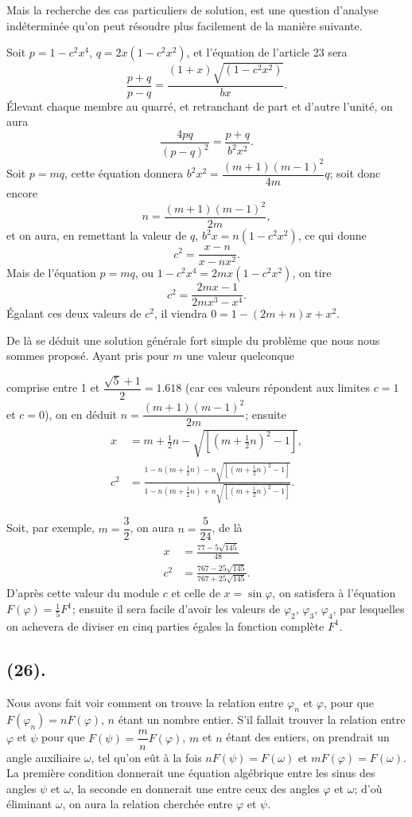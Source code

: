 \documentclass{article}
\begin{document}
Mais la recherche des cas particuliers de solution, est une question d'analyse indéterminée qu'on peut résoudre plus facilement de la manière suivante.

Soit $p=1-c^{2}x^{4}$, $q=2x(1-c^{2}x^{2})$, et l'équation de l'article 23 sera
\[ \frac{p+q}{p-q}=\frac{(1+x)\sqrt{(1-c^{2}x^{2})}}{bx}. \]
Élevant chaque membre au quarré, et retranchant de part et d'autre l'unité, on aura
\[ \frac{4pq}{(p-q)^{2}}=\frac{p+q}{b^{2}x^{2}}. \]
Soit $p=mq$, cette équation donnera $b^{2}x^{2}=\dfrac{(m+1)(m-1)^{2}}{4m}q$; soit donc encore
\[ n=\frac{(m+1)(m-1)^{2}}{2m}, \]
et on aura, en remettant la valeur de $q$, $b^{2}x=n(1-c^{2}x^{2})$, ce qui donne
\[ c^{2}=\frac{x-n}{x-nx^{2}}. \]
Mais de l'équation $p=mq$, ou $1-c^{2}x^{4}=2mx(1-c^{2}x^{2})$, on tire
\[ c^{2}=\frac{2mx-1}{2mx^{3}-x^{4}}. \]
Égalant ces deux valeurs de $c^{2}$, il viendra $0=1-(2m+n)x+x^{2}$.

De là se déduit une solution générale fort simple du problème que nous nous sommes proposé. Ayant pris pour $m$ une valeur quelconque

comprise entre 1 et $\dfrac{\sqrt{5}+1}{2}=1.618$ (car ces valeurs répondent aux limites $c=1$ et $c=0$), on en déduit $n=\dfrac{(m+1)(m-1)^{2}}{2m}$; ensuite
\[ \begin{aligned} x &= m+\tfrac{1}{2}n-\sqrt{[(m+\tfrac{1}{2}n)^{2}-1]}, \\ c^{2} &= \frac{1-n(m+\frac{1}{2}n)-n\sqrt{[(m+\frac{1}{2}n)^{2}-1]}}{1-n(m+\frac{1}{2}n)+n\sqrt{[(m+\frac{1}{2}n)^{2}-1]}}. \end{aligned} \]

Soit, par exemple, $m=\dfrac{3}{2}$, on aura $n=\dfrac{5}{24}$, de là
\[ \begin{aligned} x &= \frac{77-5\sqrt{145}}{48} \\ c^{2} &= \frac{767-25\sqrt{145}}{767+25\sqrt{145}}. \end{aligned} \]
D'après cette valeur du module $c$ et celle de $x=\sin\varphi$, on satisfera à l'équation $F(\varphi)=\frac{1}{5}F^{1}$; ensuite il sera facile d'avoir les valeurs de $\varphi_{2}$, $\varphi_{3}$, $\varphi_{4}$, par lesquelles on achevera de diviser en cinq parties égales la fonction complète $F^{1}$.

\subsection*{(26).}

Nous avons fait voir comment on trouve la relation entre $\varphi_{n}$ et $\varphi$, pour que $F(\varphi_{n})=nF(\varphi)$, $n$ étant un nombre entier. S'il fallait trouver la relation entre $\varphi$ et $\psi$ pour que $F(\psi)=\dfrac{m}{n}F(\varphi)$, $m$ et $n$ étant des entiers, on prendrait un angle auxiliaire $\omega$, tel qu'on eût à la fois $nF(\psi)=F(\omega)$ et $mF(\varphi)=F(\omega)$. La première condition donnerait une équation algébrique entre les sinus des angles $\psi$ et $\omega$, la seconde en donnerait une entre ceux des angles $\varphi$ et $\omega$; d'où éliminant $\omega$, on aura la relation cherchée entre $\varphi$ et $\psi$.
\end{document}
